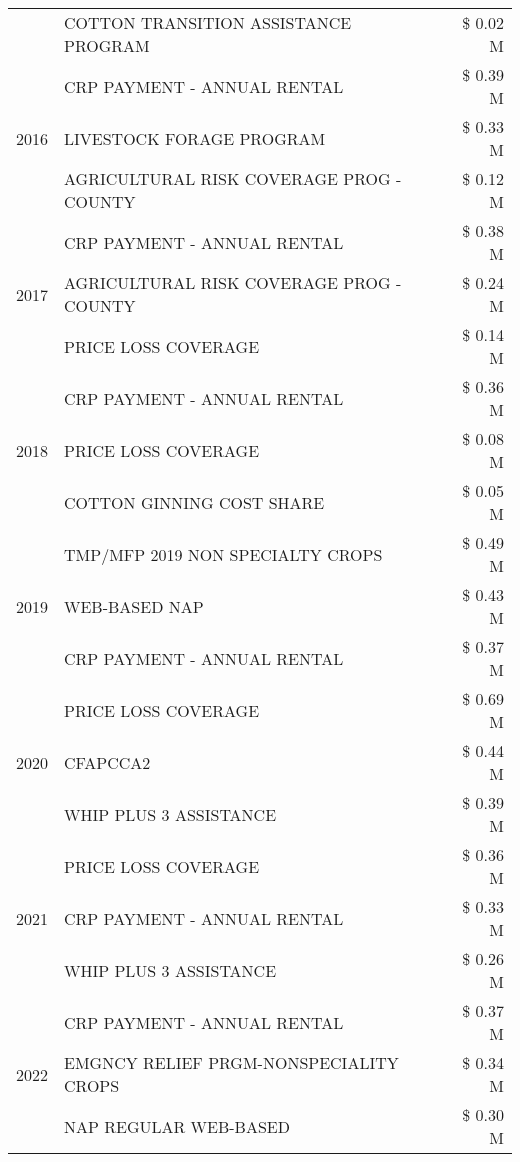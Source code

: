 \begin{tabular}{llr}
 & COTTON TRANSITION ASSISTANCE PROGRAM & \$ 0.02 M \\
\cline{1-3}
\multirow[t]{3}{*}{2016} & CRP PAYMENT - ANNUAL RENTAL & \$ 0.39 M \\
 & LIVESTOCK FORAGE PROGRAM & \$ 0.33 M \\
 & AGRICULTURAL RISK COVERAGE PROG - COUNTY & \$ 0.12 M \\
\cline{1-3}
\multirow[t]{3}{*}{2017} & CRP PAYMENT - ANNUAL RENTAL & \$ 0.38 M \\
 & AGRICULTURAL RISK COVERAGE PROG - COUNTY & \$ 0.24 M \\
 & PRICE LOSS COVERAGE & \$ 0.14 M \\
\cline{1-3}
\multirow[t]{3}{*}{2018} & CRP PAYMENT - ANNUAL RENTAL & \$ 0.36 M \\
 & PRICE LOSS COVERAGE & \$ 0.08 M \\
 & COTTON GINNING COST SHARE & \$ 0.05 M \\
\cline{1-3}
\multirow[t]{3}{*}{2019} & TMP/MFP 2019 NON SPECIALTY CROPS & \$ 0.49 M \\
 & WEB-BASED NAP & \$ 0.43 M \\
 & CRP PAYMENT - ANNUAL RENTAL & \$ 0.37 M \\
\cline{1-3}
\multirow[t]{3}{*}{2020} & PRICE LOSS COVERAGE & \$ 0.69 M \\
 & CFAPCCA2 & \$ 0.44 M \\
 & WHIP PLUS 3 ASSISTANCE & \$ 0.39 M \\
\cline{1-3}
\multirow[t]{3}{*}{2021} & PRICE LOSS COVERAGE & \$ 0.36 M \\
 & CRP PAYMENT - ANNUAL RENTAL & \$ 0.33 M \\
 & WHIP PLUS 3 ASSISTANCE & \$ 0.26 M \\
\cline{1-3}
\multirow[t]{3}{*}{2022} & CRP PAYMENT - ANNUAL RENTAL & \$ 0.37 M \\
 & EMGNCY RELIEF PRGM-NONSPECIALITY CROPS & \$ 0.34 M \\
 & NAP REGULAR WEB-BASED & \$ 0.30 M \\
\cline{1-3}
\bottomrule
\end{tabular}
